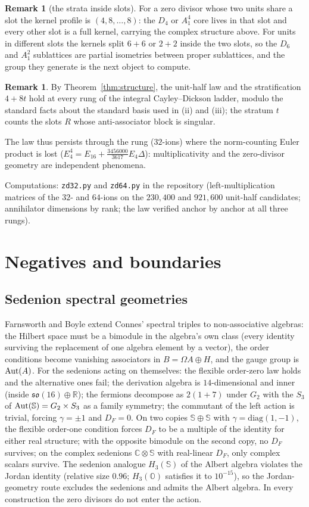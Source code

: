 \documentclass[11pt]{amsart}
\theoremstyle{definition}
\newtheorem{remark}[theorem]{Remark}
\renewcommand{\O}{\mathbb{O}}\newcommand{\Sd}{\mathbb{S}}\newcommand{\Hq}{\mathbb{H}}\newcommand{\Z}{\mathbb{Z}}\newcommand{\Q}{\mathbb{Q}}\newcommand{\R}{\mathbb{R}}\newcommand{\C}{\mathbb{C}}\newcommand{\F}{\mathbb{F}}
\begin{document}
\begin{remark}[the strata inside slots]
For a zero divisor whose two units share a slot the kernel profile is $(4,8,\dots,8)$: the $D_4$ or $A_1^4$ core lives in that slot and every other slot is a full kernel, carrying the complex structure above. For units in different slots the kernels split $6+6$ or $2+2$ inside the two slots, so the $D_6$ and $A_1^2$ sublattices are partial isometries between proper sublattices, and the group they generate is the next object to compute.
\end{remark}

\begin{remark}
By Theorem~\ref{thm:structure}, the unit-half law and the stratification $4+8t$ hold at every rung of the integral Cayley--Dickson ladder, modulo the standard facts about the standard basis used in (ii) and (iii); the stratum $t$ counts the slots $R$ whose anti-associator block is singular.
\end{remark}
The law thus persists through the rung ($32$-ions) where the norm-counting Euler product is lost ($E_4^4=E_{16}+\tfrac{3456000}{3617}E_4\Delta$): multiplicativity and the zero-divisor geometry are independent phenomena.

Computations: \texttt{zd32.py} and \texttt{zd64.py} in the repository (left-multiplication matrices of the $32$- and $64$-ions on the $230{,}400$ and $921{,}600$ unit-half candidates; annihilator dimensions by rank; the law verified anchor by anchor at all three rungs).

\section{Negatives and boundaries}\label{sec:negatives}
\subsection{Sedenion spectral geometries}
Farnsworth and Boyle \cite{FB13,BF14} extend Connes' spectral triples to non-associative algebras: the Hilbert space must be a bimodule in the algebra's own class (every identity surviving the replacement of one algebra element by a vector), the order conditions become vanishing associators in $B=\Omega A\oplus H$, and the gauge group is $\operatorname{Aut}(A)$. For the sedenions acting on themselves: the flexible order-zero law holds and the alternative ones fail; the derivation algebra is $14$-dimensional and inner (inside $\mathfrak{so}(16)\oplus\R$); the fermions decompose as $2(1+7)$ under $G_2$ with the $S_3$ of $\Aut(\Sd)=G_2\times S_3$ as a family symmetry; the commutant of the left action is trivial, forcing $\gamma=\pm 1$ and $D_F=0$. On two copies $\Sd\oplus\Sd$ with $\gamma=\mathrm{diag}(1,-1)$, the flexible order-one condition forces $D_F$ to be a multiple of the identity for either real structure; with the opposite bimodule on the second copy, no $D_F$ survives; on the complex sedenions $\C\otimes\Sd$ with real-linear $D_F$, only complex scalars survive. The sedenion analogue $H_3(\Sd)$ of the Albert algebra violates the Jordan identity (relative size $0.96$; $H_3(\O)$ satisfies it to $10^{-15}$), so the Jordan-geometry route \cite{BF14} excludes the sedenions and admits the Albert algebra. In every construction the zero divisors do not enter the action.
\end{document}
